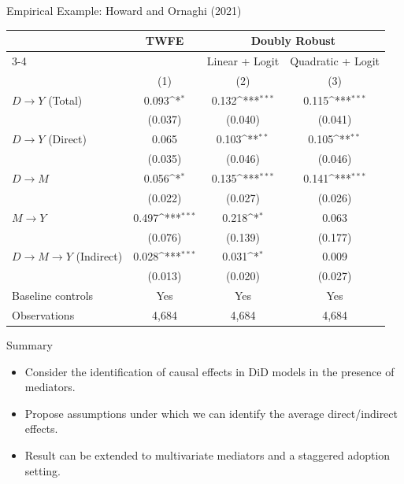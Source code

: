 \documentclass[aspectratio=1610, 9pt]{beamer}
\newcommand{\sym}[1]{\ifmmode^{#1}\else\(^{#1}\)\fi}
\begin{document}
\begin{frame}{Empirical Example: Howard and Ornaghi (2021)} \label{ADTT_estimate}
\vspace{-0.4cm}
\begin{table}
\centering
\begin{threeparttable}

\label{tab:estimates}
\renewcommand{\arraystretch}{0.98}
\setlength{\tabcolsep}{9pt}

\begin{tabular}{lccc}
\toprule
& TWFE
& \multicolumn{2}{c}{Doubly Robust} \\
\cmidrule(lr){3-4}
& & Linear + Logit & Quadratic + Logit \\
& (1) & (2) & (3) \\
\midrule

$D \to Y$ (Total)
& 0.093\sym{*}
& 0.132\sym{***}
& 0.115\sym{***} \\
& (0.037)
& (0.040)
& (0.041) \\[3pt]

$D \to Y$ (Direct)
& 0.065
& 0.103\sym{**}
& 0.105\sym{**} \\
& (0.035)
& (0.046)
& (0.046) \\[3pt]

$D \to M$
& 0.056\sym{*}
& 0.135\sym{***}
& 0.141\sym{***} \\
& (0.022)
& (0.027)
& (0.026) \\[3pt]

$M \to Y$
& 0.497\sym{***}
& 0.218\sym{*}
& 0.063 \\
& (0.076)
& (0.139)
& (0.177) \\[3pt]

$D \to M \to Y$ (Indirect)
& 0.028\sym{***}
& 0.031\sym{*}
& 0.009 \\
& (0.013)
& (0.020)
& (0.027) \\

\midrule
Baseline controls & Yes & Yes & Yes \\
Observations      & 4{,}684 & 4{,}684 & 4{,}684 \\
\bottomrule
\end{tabular}
\end{threeparttable}
\end{table}
\end{frame}





\begin{frame}{Summary}

\begin{itemize}

        \item Consider the identification of causal effects in DiD models in the presence of mediators.
        \item Propose assumptions under which we can identify the average direct/indirect effects.
        \item Result can be extended to multivariate mediators and a staggered adoption setting.
    \end{itemize}

    
\end{frame}
\end{document}
